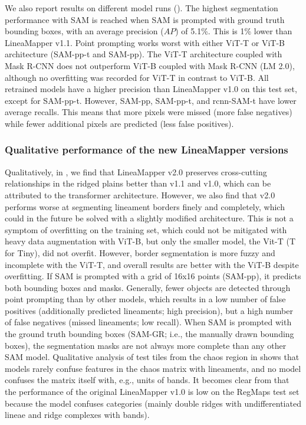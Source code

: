 We also report results on different model runs (). The highest segmentation performance with SAM is reached when SAM is prompted with ground truth bounding boxes, with an average precision ($AP$) of 5.1\%. This is 1\% lower than LineaMapper v1.1.
Point prompting works worst with either ViT-T or ViT-B architecture (SAM-pp-t and SAM-pp). The ViT-T architecture coupled with Mask R-CNN does not outperform ViT-B coupled with Mask R-CNN (LM 2.0), although no overfitting was recorded for ViT-T in contrast to ViT-B. All retrained models have a higher precision than LineaMapper v1.0 on this test set, except for SAM-pp-t. However, SAM-pp, SAM-pp-t, and rcnn-SAM-t have lower average recalls. This means that more pixels were missed (more false negatives) while fewer additional pixels are predicted (less false positives).


\subsubsection{Qualitative performance of the new LineaMapper versions}\label{sec:qualtitative_LM}
Qualitatively, in , we find that LineaMapper v2.0 preserves cross-cutting relationships in the ridged plains better than v1.1 and v1.0, which can be attributed to the transformer architecture. However, we also find that v2.0 performs worse at segmenting lineament borders finely and completely, which could in the future be solved with a slightly modified architecture. This is not a symptom of overfitting on the training set, which could not be mitigated with heavy data augmentation with ViT-B, but only the smaller model, the Vit-T (T for Tiny), did not overfit. However, border segmentation is more fuzzy and incomplete with the ViT-T, and overall results are better with the ViT-B despite overfitting.
If SAM is prompted with a grid of 16x16 points (SAM-pp), it predicts both bounding boxes and masks. Generally, fewer objects are detected through point prompting than by other models, which results in a low number of false positives (additionally predicted lineaments; high precision), but a high number of false negatives (missed lineaments; low recall). When SAM is prompted with the ground truth bounding boxes (SAM-GR; i.e., the manually drawn bounding boxes), the segmentation masks are not always more complete than any other SAM model. 
Qualitative analysis of test tiles from the chaos region in  shows that models rarely confuse features in the chaos matrix with lineaments, and no model confuses the matrix itself with, e.g., units of bands. 
It becomes clear from  that the performance of the original LineaMapper v1.0 is low on the RegMaps test set because the model confuses categories (mainly double ridges with undifferentiated lineae and ridge complexes with bands).

